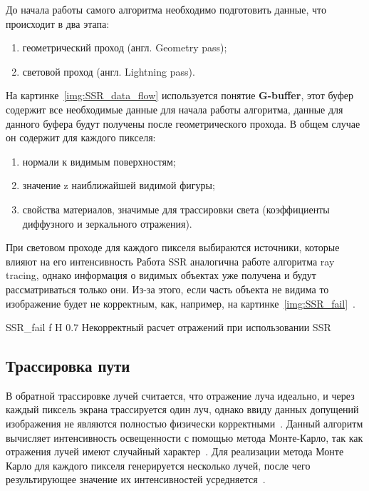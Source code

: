 До начала работы самого алгоритма необходимо подготовить данные, что происходит в два этапа:
\begin{enumerate}
	\item геометрический проход (англ. Geometry pass);
	\item световой проход (англ. Lightning pass).
\end{enumerate}

На картинке~\ref{img:SSR_data_flow} используется понятие \textbf{G-buffer}, этот буфер содержит все необходимые данные для начала работы алгоритма, данные для данного буфера
будут получены после геометрического прохода. В общем случае он содержит для каждого пикселя:
\begin{enumerate}
	\item нормали к видимым поверхностям;
	\item значение z наиближайшей видимой фигуры;
	\item свойства материалов, значимые для трассировки света (коэффициенты диффузного и зеркального отражения).
\end{enumerate}
При световом проходе для каждого пикселя выбираются источники, которые влияют на его интенсивность
Работа SSR аналогична работе алгоритма ray tracing, однако информация о видимых объектах уже получена и будут рассматриваться только они.
Из-за этого, если часть объекта не видима то изображение будет не корректным, как, например, на картинке~\ref{img:SSR_fail}~\cite{SSR,reflexion_types}.


{SSR_fail} %
{f} %
{H} %
{0.7\textwidth} %
{Некорректный расчет отражений при использовании SSR} %





\subsection{Трассировка пути}
В обратной трассировке лучей считается, что отражение луча идеально,  и через каждый пиксель экрана трассируется один луч, однако ввиду данных допущений
изображения не являются полностью физически корректными~\cite{ray_path_tracing}.
Данный алгоритм вычисляет интенсивность освещенности с помощью метода Монте-Карло, так как отражения лучей имеют случайный характер~\cite{monte_carlo}.
Для реализации метода Монте Карло  для каждого пикселя генерируется несколько  лучей,
после чего результирующее значение их интенсивностей усредняется~\cite{path_tracing_def}.

